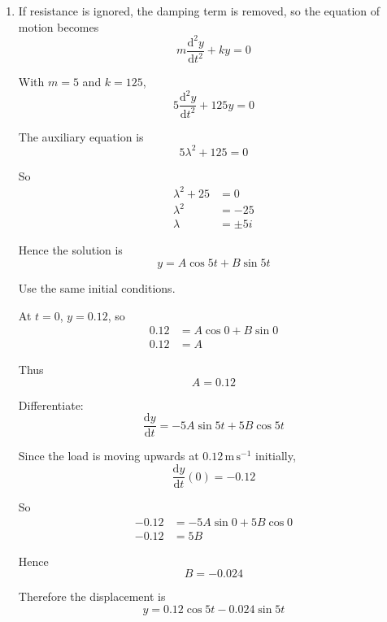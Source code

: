 \documentclass[leqno]{article}
\begin{document}
\begin{enumerate}[
  label=\textbf{\arabic*.},
  leftmargin=*,
  topsep=0pt,
  partopsep=0pt,
  parsep=0pt
]
\begin{tcolorbox}[colback=white, colframe=scarlet, title={\textbf{Solution}}, breakable, grow to left by=6mm, grow to right by=10mm]
\begin{enumerate}[label=\textbf{(\alph*)}]
\begin{enumerate}[label=(\roman*)]
    Rearranging,
    \[
    \sin 4t=-2\cos 4t
    \]

    So
    \[
    \tan 4t=-2
    \]

    The first positive solution occurs in quadrant II, so
    \[
    4t=\pi-\arctan 2
    \]

    Hence
    \[
    t=\frac{\pi-\arctan 2}{4}
    \]

    Therefore,
    \[
    t=\frac{\pi-\arctan 2}{4}\approx 0.509\text{ s}
    \]

    So the first positive time is
    \[
    0.509\text{ s}
    \]
  \end{enumerate}

  \item If resistance is ignored, the damping term is removed, so the equation of motion becomes
  \[
  m\frac{\mathrm{d}^2y}{\mathrm{d}t^2}+ky=0
  \]

  With $m=5$ and $k=125$,
  \[
  5\frac{\mathrm{d}^2y}{\mathrm{d}t^2}+125y=0
  \]

  The auxiliary equation is
  \[
  5\lambda^2+125=0
  \]

  So
  \begin{align*}
  \lambda^2+25&=0 \\
  \lambda^2&=-25 \\
  \lambda&=\pm 5i
  \end{align*}

  Hence the solution is
  \[
  y=A\cos 5t+B\sin 5t
  \]

  Use the same initial conditions.

  At $t=0$, $y=0.12$, so
  \begin{align*}
  0.12&=A\cos 0+B\sin 0 \\
  0.12&=A
  \end{align*}

  Thus
  \[
  A=0.12
  \]

  Differentiate:
  \[
  \frac{\mathrm{d}y}{\mathrm{d}t}=-5A\sin 5t+5B\cos 5t
  \]

  Since the load is moving upwards at $0.12\,\mathrm{m\,s^{-1}}$ initially,
  \[
  \frac{\mathrm{d}y}{\mathrm{d}t}(0)=-0.12
  \]

  So
  \begin{align*}
  -0.12&=-5A\sin 0+5B\cos 0 \\
  -0.12&=5B
  \end{align*}

  Hence
  \[
  B=-0.024
  \]

  Therefore the displacement is
  \[
  y=0.12\cos 5t-0.024\sin 5t
  \]
\end{enumerate}
\end{tcolorbox}



\end{enumerate}
\end{document}
